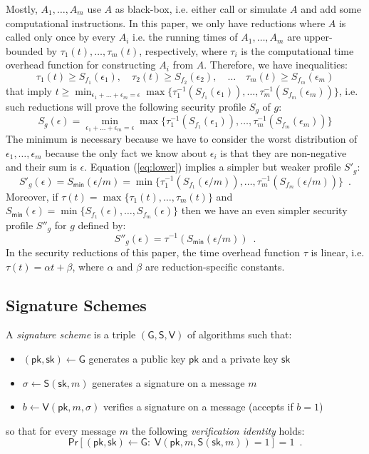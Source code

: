 \documentclass{article}
\newcommand{\keygen}[0]{\mathsf{G}}
\newcommand{\sig}[0]{\mathsf{S}}
\newcommand{\sigver}[0]{\mathsf{V}}
\newcommand{\pubkey}[0]{\mathsf{pk}}
\newcommand{\prikey}[0]{\mathsf{sk}}
\begin{document}
Mostly, $A_1, \ldots, A_m$ use $A$ as black-box, i.e. either call or simulate $A$ and add some computational instructions. In this paper, we only have reductions where $A$ is called only once by every $A_i$ i.e. the running times of $A_1,\ldots,A_m$ are upper-bounded by $\tau_1(t), \ldots, \tau_m(t)$, respectively, where $\tau_i$ is the computational time overhead function for constructing $A_i$ from $A$.
Therefore, we have inequalities:
\[
\tau_1(t) \ge S_{f_1}(\epsilon_1), \quad \tau_2(t) \ge S_{f_2}(\epsilon_2), \quad \ldots\quad
\tau_m(t)\ge S_{f_m}(\epsilon_m)
\]
that imply $t\ge \min_{\epsilon_1 + \ldots + \epsilon_m = \epsilon}\max\{\tau^{-1}_1(S_{f_1}(\epsilon_1)), \ldots, \tau^{-1}_m(S_{f_m}(\epsilon_m))\}$, i.e. such reductions will prove the following security profile $S_g$ of $g$:
\begin{equation}\label{eq:lower}
S_g(\epsilon) = \min_{\epsilon_1 + \ldots + \epsilon_m = \epsilon}\max\{\tau^{-1}_1(S_{f_1}(\epsilon_1)), \ldots, \tau^{-1}_m(S_{f_m}(\epsilon_m))\}
\end{equation}
The minimum is necessary because we have to consider the worst distribution of $\epsilon_1,\ldots, \epsilon_m$ because the only fact we know about $\epsilon_i$ is that they are non-negative and their sum is $\epsilon$.
Equation (\ref{eq:lower}) implies a simpler but weaker profile $S'_g$:
\[
S'_g(\epsilon) = S_\mathsf{min}(\epsilon /m) =
 \min\{\tau^{-1}_1(S_{f_1}(\epsilon/m)), \ldots, \tau^{-1}_m(S_{f_m}(\epsilon/m))\}\enspace.
\]
Moreover, if $\tau(t)=\max\{\tau_1(t), \ldots, \tau_m(t)\}$ and $S_\mathsf{min}(\epsilon)= \min\{S_{f_1}(\epsilon), \ldots, S_{f_m}(\epsilon)\}$ then we have an even simpler security profile $S''_g$ for $g$ defined by:
\begin{equation}\label{eq:losebound}
S''_g(\epsilon) = \tau^{-1}(S_\mathsf{min}(\epsilon/m))\enspace.
\end{equation}
In the security reductions of this paper, the time overhead function $\tau$ is linear, i.e. $\tau(t) = \alpha t + \beta$, where $\alpha$ and $\beta$ are reduction-specific constants.

\subsection{Signature Schemes}

A \emph{signature scheme} is a triple $(\keygen, \sig, \sigver)$ of algorithms such that:
\begin{itemize}
\item $(\pubkey, \prikey) \gets \keygen$ generates a public key $\pubkey$ and a private key $\prikey$
\item $\sigma \gets \sig(\prikey, m)$ generates a signature on a message $m$
\item $b \gets \sigver (\pubkey, m, \sigma)$ verifies a signature on a message (accepts if $b = 1$)
\end{itemize}
so that for every message $m$ the following \emph{verification identity} holds:
\[
\mathsf{Pr}[(\pubkey, \prikey) \gets \keygen \colon\; \sigver(\pubkey, m, \sig(\prikey, m)) = 1] = 1 \enspace.
\]
\end{document}
